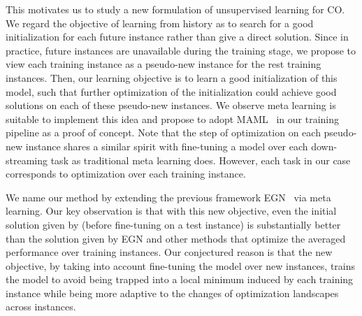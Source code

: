 This motivates us to study a new formulation of unsupervised learning for CO. We regard the objective of learning from history as to search for a good initialization for each future instance rather than give a direct solution. Since in practice, future instances are unavailable during the training stage, we propose to view each training instance as a pseudo-new instance for the rest training instances. 
Then, our learning objective is to learn a good initialization of this model, such that further optimization of the initialization could achieve good solutions on each of these pseudo-new instances. We observe meta learning is suitable to implement this idea and propose to adopt MAML~\citep{finn2017model} in our training pipeline as a proof of concept. Note that the step of optimization on each pseudo-new instance shares a similar spirit with fine-tuning a model over each down-streaming task as traditional meta learning does. However, each task in our case corresponds to optimization over each training instance. 

We name our method \proj by extending the previous framework EGN~\citep{karalias2020erdos} via meta learning. Our key observation is that with this new objective, even the initial solution given by \proj (before fine-tuning on a test instance) is substantially better than the solution given by EGN and other methods that optimize the averaged performance over training instances. Our conjectured reason is that the new objective, by taking into account fine-tuning the model over new instances, trains the model to avoid being trapped into a local minimum induced by each training instance while being more adaptive to the changes of optimization landscapes across instances.%




